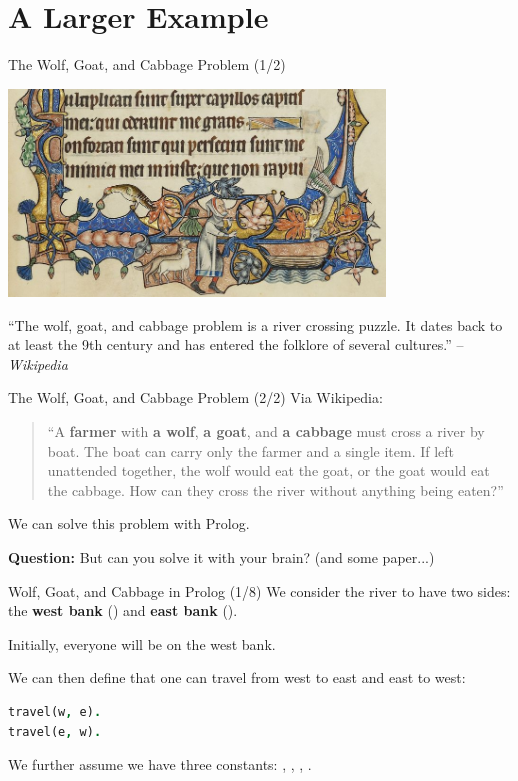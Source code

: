 \section{A Larger Example}

\begin{frame}{The Wolf, Goat, and Cabbage Problem (1/2)}
\begin{center}
\includegraphics[width=0.75\textwidth]{img/river-problem.jpg}
\end{center}
\begin{small}
``The wolf, goat, and cabbage problem is a river crossing puzzle. It dates back
to at least the 9th century and has entered the folklore of several cultures.'' -- \textsl{Wikipedia}
\end{small}
\end{frame}

\begin{frame}{The Wolf, Goat, and Cabbage Problem (2/2)}
Via Wikipedia:

\bigskip

\begin{quote}
``A \textbf{farmer} with \textbf{a wolf}, \textbf{a goat}, and \textbf{a
cabbage} must cross a river by boat. The boat can carry only the farmer and a
single item. If left unattended together, the wolf would eat the goat, or the
goat would eat the cabbage. How can they cross the river without anything being
eaten?''
\end{quote}

\bigskip

We can solve this problem with Prolog. 

\pause

\textbf{Question:} But can you solve it with your brain? (and some paper...)
\end{frame}

\begin{frame}[fragile]{Wolf, Goat, and Cabbage in Prolog (1/8)}
We consider the river to have two sides: the \textbf{west bank} () and
\textbf{east bank} ().

Initially, everyone will be on the west bank.

We can then define that one can travel from west to east and east to west:

\begin{lstlisting}[language=prolog, xleftmargin=0.5cm]
travel(w, e). 
travel(e, w).
\end{lstlisting}

We further assume we have three constants: , ,
, .
\end{frame}

